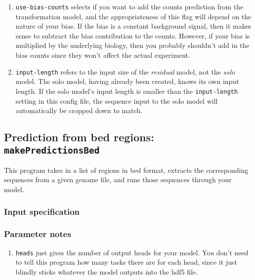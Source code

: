 \documentclass{article}
\begin{document}
\begin{enumerate}
    \item \texttt{use-bias-counts} selects if you want to add the counts
        prediction from the transformation model, and the appropriateness of
        this flag will depend on the nature of your bias.
        If the bias is a constant background signal, then it makes sense to
        subtract the bias contribution to the counts.
        However, if your bias is multiplied by the underlying biology, then you
        probably shouldn't add in the bias counts since they won't affect the
        actual experiment.
    \item \texttt{input-length} refers to the input size of the \emph{residual}
        model, not the \emph{solo} model.
        The solo model, having already been created, knows its own input length.
        If the solo model's input length is smaller than the
        \texttt{input-length} setting in this config file, the sequence input
        to the solo model will automatically be cropped down to match.
\end{enumerate}




\newpage

\subsection{Prediction from bed regions: \texttt{makePredictionsBed}}\label{prog:makePredictionsBed}

This program takes in a list of regions in bed format, extracts the
corresponding sequences from a given genome file, and runs those sequences
through your model.


\subsubsection{Input specification}



\subsubsection{Parameter notes}

\begin{enumerate}
    \item \texttt{heads} just gives the number of output heads for your model.
        You don't need to tell this program how many tasks there are for each
        head, since it just blindly sticks whatever the model outputs into the
        hdf5 file.
\end{enumerate}
\end{document}
